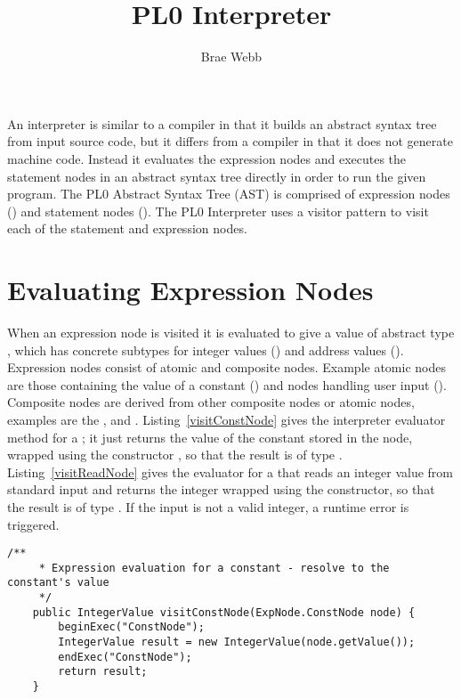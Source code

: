 \documentclass[a4paper,twoside]{article}
\begin{document}
\thispagestyle{empty}
\title{\vspace*{-3cm}PL0 Interpreter}
\author{Brae Webb}
\maketitle
\pagestyle{myheadings}
\vspace*{-4ex}


An interpreter is similar to a compiler in that it builds an abstract syntax tree from input source code,
but it differs from a compiler in that it does not generate machine code. 
Instead it evaluates the expression nodes and 
executes the statement nodes in an abstract syntax tree directly in order to run the given program.
%
The PL0 Abstract Syntax Tree (AST) is comprised of expression nodes
() and statement nodes (). The PL0
Interpreter uses a visitor pattern to visit each of the statement and expression
nodes.

\section{Evaluating Expression Nodes}\label{section:expressions}
When an expression node is visited it is evaluated to give a value of abstract type ,
which has concrete subtypes for integer values () and address values ().
Expression nodes consist of atomic and composite nodes. 
Example atomic nodes are 
those containing the value of a constant ()
and
nodes handling user input ().
Composite nodes are derived from
other composite nodes or atomic nodes, examples are the ,
and .
Listing~\ref{visitConstNode} gives the interpreter evaluator method for a ;
it just returns the value of the constant stored in the node, 
wrapped using the constructor ,
so that the result is of type .
Listing~\ref{visitReadNode} gives the evaluator for a 
that reads an integer value from standard input and returns the integer
wrapped using the  constructor,
so that the result is of type .
If the input is not a valid integer, a runtime error is triggered.

\begin{figure*}[h]
\begin{lstlisting}[caption=Evaluating a ConstNode,label=visitConstNode]
    /**
     * Expression evaluation for a constant - resolve to the constant's value
     */
    public IntegerValue visitConstNode(ExpNode.ConstNode node) {
        beginExec("ConstNode");
        IntegerValue result = new IntegerValue(node.getValue());
        endExec("ConstNode");
        return result;
    }
\end{lstlisting}
\end{figure*}
\end{document}
